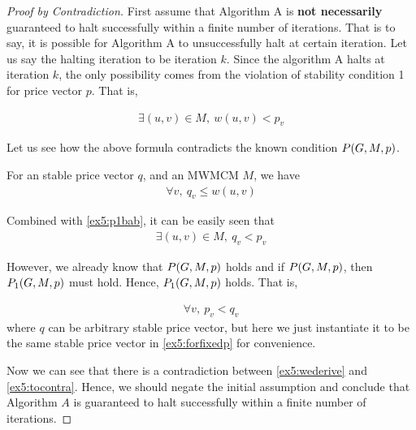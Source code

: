 \documentclass[11pt,a4paper]{article}
\begin{document}
\begin{proof}[Proof by Contradiction]
    First assume that Algorithm A is {\bf not necessarily} guaranteed to halt
    successfully within a finite number of iterations. That is to say, it is
    possible for Algorithm A to unsuccessfully halt at certain iteration. Let
    us say the halting iteration to be iteration $k$. Since the algorithm A
    halts at iteration $k$, the only possibility comes from the violation of stability
    condition 1 for price vector $p$. That is,
    
    \begin{align}  \label{ex5:p1bab}
        \exists (u,v) \in M,\ w(u,v) < p_v
    \end{align}

    Let us see how the above formula contradicts the known condition $P(G, M, p)$.

    For an stable price vector $q$, and an MWMCM $M$, we have
    \begin{align} \label{ex5:forfixedp}
        \forall v,\ q_v \leq w(u,v)
    \end{align}

    Combined with \eqref{ex5:p1bab}, it can be easily seen that 
    \begin{align} \label{ex5:wederive}
        \exists (u,v) \in M,\ q_v < p_v
    \end{align}

    However, we already know that $P(G, M, p)$ holds and if $P(G, M, p)$, then $P_1(G, M, p)$ must
    hold.  Hence, $P_1(G, M, p)$ holds. That is,

    \begin{align} \label{ex5:tocontra}
        \forall v,\ p_v < q_v
    \end{align}
    where $q$ can be arbitrary stable price vector, but here we just
    instantiate it to be the same stable price vector in \eqref{ex5:forfixedp} for convenience.

    Now we can see that there is a contradiction between \eqref{ex5:wederive}
    and \eqref{ex5:tocontra}. Hence, we should negate the initial assumption
    and conclude that Algorithm $A$ is guaranteed to halt successfully within
    a finite number of iterations. 

\end{proof}
\end{document}
